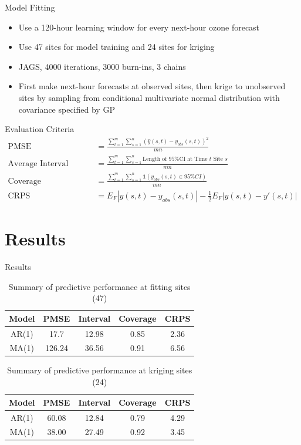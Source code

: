 \documentclass{beamer}
\begin{document}
\begin{frame}{Model Fitting}
\begin{itemize}
\item Use a 120-hour learning window for every next-hour ozone forecast
\item Use 47 sites for model training and 24 sites for kriging
\item JAGS, 4000 iterations, 3000 burn-ins, 3 chains
\item First make next-hour forecasts at observed sites, then krige to unobserved sites by sampling from conditional multivariate normal distribution with covariance specified by GP
\end{itemize}
\end{frame}

\begin{frame}{Evaluation Criteria}
\begin{align*}
\text{PMSE} &= \frac{\sum_{t = 1}^m\sum_{s = 1}^{n}(\hat{y}(s, t) - y_{obs}(s, t))^2}{mn} \\
\text{Average Interval Length} &= \frac{\sum_{t = 1}^{m}\sum_{s = 1}^{n}\text{Length of 95\% CI at Time $t$ Site $s$}}{mn} \\
\text{Coverage} &= \frac{\sum_{t = 1}^{m}\sum_{s = 1}^{n}\mathbf{1}(y_{obs}(s, t) \in 95\% CI)}{mn} \\
\text{CRPS} &= E_{F}|y(s, t) - y_{obs}(s, t)| - \frac{1}{2}E_{F}|y(s, t) - y'(s, t)|
\end{align*}
\end{frame}

\section{Results}

\begin{frame}{Results}
\begin{table}[H]
\centering
\begin{tabular}{|c c c c c|}
\hline
Model & PMSE & Interval & Coverage & CRPS \\\hline 
AR(1) & 17.7 & 12.98 & 0.85 & 2.36\\
MA(1) & 126.24 & 36.56 & 0.91 & 6.56 \\\hline
\end{tabular}
\caption{Summary of predictive performance at fitting sites (47)}
\end{table}

\begin{table}[H]
\centering
\begin{tabular}{|c c c c c|}
\hline
Model & PMSE & Interval & Coverage & CRPS \\\hline 
AR(1) & 60.08 & 12.84 & 0.79 & 4.29\\
MA(1) & 38.00 & 27.49 & 0.92 & 3.45 \\\hline
\end{tabular}
\caption{Summary of predictive performance at kriging sites (24)}
\end{table}
\end{frame}
\end{document}
